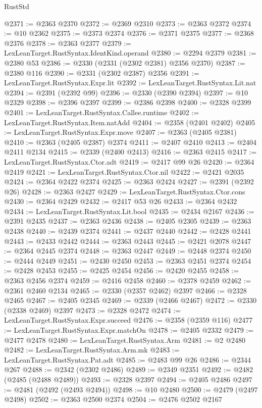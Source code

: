 \begin{lexlean}{RustStd}
\begin{coremodule}
@2371 := @2363 @2370
@2372 := @2369 @2310
@2373 := @2363 @2372
@2374 := @10 @2362
@2375 := @2373 @2374
@2376 := @2371 @2375
@2377 := @2368 @2376
@2378 := @2363 @2377
@2379 := LexLeanTarget.RustSyntax.IdentKind.operand
@2380 := @2294 @2379
@2381 := @2380 @53
@2386 := @2330 (@2331 (@2302 @2381) @2356 @2370)
@2387 := @2380 @116
@2390 := @2331 (@2302 @2387) @2356
@2391 := LexLeanTarget.RustSyntax.Expr.lit
@2392 := LexLeanTarget.RustSyntax.Lit.nat
@2394 := @2391 (@2392 @99)
@2396 := @2330 (@2390 @2394)
@2397 := @10 @2329
@2398 := @2396 @2397
@2399 := @2386 @2398
@2400 := @2328 @2399
@2401 := LexLeanTarget.RustSyntax.Callee.runtime
@2402 := LexLeanTarget.RustSyntax.Item.natAdd
@2404 := @2358 (@2401 @2402)
@2405 := LexLeanTarget.RustSyntax.Expr.move
@2407 := @2363 (@2405 @2381)
@2410 := @2363 (@2405 @2387) @2374
@2411 := @2407 @2410
@2413 := @2404 @2411 @2134
@2415 := @2339 (@2400 @2413)
@2416 := @2363 @2415
@2417 := LexLeanTarget.RustSyntax.Ctor.adt
@2419 := @2417 @99 @26
@2420 := @2364 @2419
@2421 := LexLeanTarget.RustSyntax.Ctor.nil
@2422 := @2421 @2035
@2424 := @2364 @2422 @2374
@2425 := @2363 @2424
@2427 := @2391 (@2392 @26)
@2428 := @2363 @2427
@2429 := LexLeanTarget.RustSyntax.Ctor.cons
@2430 := @2364 @2429
@2432 := @2417 @53 @26
@2433 := @2364 @2432
@2434 := LexLeanTarget.RustSyntax.Lit.bool
@2435 := @2434 @2167
@2436 := @2391 @2435
@2437 := @2363 @2436
@2438 := @2405 @2305
@2439 := @2363 @2438
@2440 := @2439 @2374
@2441 := @2437 @2440
@2442 := @2428 @2441
@2443 := @2433 @2442
@2444 := @2363 @2443
@2445 := @2421 @2078
@2447 := @2364 @2445 @2374
@2448 := @2363 @2447
@2449 := @2448 @2374
@2450 := @2444 @2449
@2451 := @2430 @2450
@2453 := @2363 @2451 @2374
@2454 := @2428 @2453
@2455 := @2425 @2454
@2456 := @2420 @2455
@2458 := @2363 @2456 @2374
@2459 := @2416 @2458
@2460 := @2378 @2459
@2462 := @2361 @2460 @2134
@2465 := @2330 (@2357 @2462) @2397
@2466 := @2328 @2465
@2467 := @2405 @2345
@2469 := @2339 (@2466 @2467)
@2472 := @2330 (@2338 @2469) @2397
@2473 := @2328 @2472
@2474 := LexLeanTarget.RustSyntax.Expr.succeed
@2476 := @2358 (@2359 @116)
@2477 := LexLeanTarget.RustSyntax.Expr.matchOn
@2478 := @2405 @2332
@2479 := @2477 @2478
@2480 := LexLeanTarget.RustSyntax.Arm
@2481 := @2 @2480
@2482 := LexLeanTarget.RustSyntax.Arm.mk
@2483 := LexLeanTarget.RustSyntax.Pat.adt
@2485 := @2483 @99 @26
@2486 := @2344 @267
@2488 := @2342 (@2302 @2486)
@2489 := @2349 @2351
@2492 := @2482 (@2485 (@2488 @2489))
@2493 := @2328 @2397
@2494 := @2405 @2486
@2497 := @2481 (@2492 (@2493 @2494))
@2498 := @10 @2480
@2500 := @2479 (@2497 @2498)
@2502 := @2363 @2500 @2374
@2504 := @2476 @2502 @2167

\end{coremodule}
\end{lexlean}
